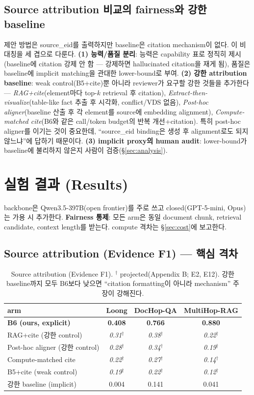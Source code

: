 \documentclass[11pt]{article}
\newcommand{\proj}[1]{\textit{#1}$^\dagger$}
\begin{document}
\subsection{Source attribution 비교의 fairness와 강한 baseline}
\label{sec:fairness}
제안 방법은 source\_eid를 출력하지만 baseline은 citation mechanism이 없다. 이 비대칭을 세 겹으로
다룬다. \textbf{(1) 능력/품질 분리}: 능력은 capability 표로 정직히 제시(baseline에 citation 강제
안 함 — 강제하면 hallucinated citation을 재게 됨), 품질은 baseline에 implicit matching을 관대한
lower-bound로 부여. \textbf{(2) 강한 attribution baseline}: weak control(B5+cite)뿐 아니라
reviewer가 요구할 강한 것들을 추가한다 — \emph{RAG+cite}(element마다 top-$k$ retrieval 후
citation), \emph{Extract-then-visualize}(table-like fact 추출 후 시각화, conflict/VDS 없음),
\emph{Post-hoc aligner}(baseline 산출 후 각 element를 source에 embedding alignment),
\emph{Compute-matched cite}(B6와 같은 call/token budget의 반복 개선+citation). 특히 post-hoc
aligner를 이기는 것이 중요한데, ``source\_eid binding은 생성 후 alignment로도 되지 않느냐''에
답하기 때문이다. \textbf{(3) implicit proxy의 human audit}: lower-bound가 baseline에 불리하지
않은지 사람이 검증(\S\ref{sec:analysis}).

\section{실험 결과 (Results)}
\label{sec:results}
backbone은 Qwen3.5-397B(open frontier)를 주로 쓰고 closed(GPT-5-mini, Opus)는 가용 시 추가한다.
\textbf{Fairness 통제}: 모든 arm은 동일 document chunk, retrieval candidate, context length를
받는다. compute 격차는 \S\ref{sec:cost}에 보고한다.

\subsection{Source attribution (Evidence F1) — 핵심 격차}
\begin{table}[h]
\centering\small
\begin{tabular}{lccc}
\toprule
arm & Loong & DocHop-QA & MultiHop-RAG \\
\midrule
\textbf{B6 (ours, explicit)} & \textbf{0.408} & \textbf{0.766} & \textbf{0.880} \\
RAG+cite (강한 control) & \proj{0.31} & \proj{0.38} & \proj{0.22} \\
Post-hoc aligner (강한 control) & \proj{0.28} & \proj{0.34} & \proj{0.19} \\
Compute-matched cite & \proj{0.22} & \proj{0.27} & \proj{0.14} \\
B5+cite (weak control) & \proj{0.19} & \proj{0.22} & \proj{0.12} \\
강한 baseline (implicit) & 0.004 & 0.141 & 0.041 \\
\bottomrule
\end{tabular}
\caption{Source attribution (Evidence F1). $^\dagger$ projected(Appendix B; E2, E12). 강한
baseline까지 모두 B6보다 낮으면 ``citation formatting이 아니라 mechanism'' 주장이 강해진다.}
\label{tab:evidence}
\end{table}
\end{document}
